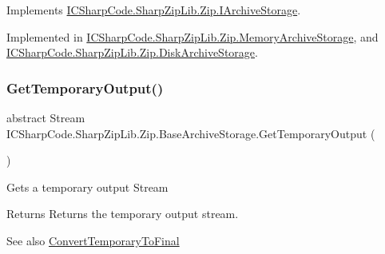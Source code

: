 Implements \hyperlink{interface_i_c_sharp_code_1_1_sharp_zip_lib_1_1_zip_1_1_i_archive_storage_ab0d4fb8b0557395851488846515ae64d}{I\+C\+Sharp\+Code.\+Sharp\+Zip\+Lib.\+Zip.\+I\+Archive\+Storage}.



Implemented in \hyperlink{class_i_c_sharp_code_1_1_sharp_zip_lib_1_1_zip_1_1_memory_archive_storage_acb1d6118fd6a693de793dd704b641ecc}{I\+C\+Sharp\+Code.\+Sharp\+Zip\+Lib.\+Zip.\+Memory\+Archive\+Storage}, and \hyperlink{class_i_c_sharp_code_1_1_sharp_zip_lib_1_1_zip_1_1_disk_archive_storage_a55cb8ad8e73dcd8196fce9c0b41336d9}{I\+C\+Sharp\+Code.\+Sharp\+Zip\+Lib.\+Zip.\+Disk\+Archive\+Storage}.

\mbox{\label{class_i_c_sharp_code_1_1_sharp_zip_lib_1_1_zip_1_1_base_archive_storage_a1327afcc22749a88959c9d8614cf4c75}} 
\subsubsection{\texorpdfstring{Get\+Temporary\+Output()}{GetTemporaryOutput()}}
{\footnotesize\ttfamily abstract Stream I\+C\+Sharp\+Code.\+Sharp\+Zip\+Lib.\+Zip.\+Base\+Archive\+Storage.\+Get\+Temporary\+Output (\begin{DoxyParamCaption}{ }\end{DoxyParamCaption})\hspace{0.3cm}{\ttfamily [pure virtual]}}



Gets a temporary output Stream 

\begin{DoxyReturn}{Returns}
Returns the temporary output stream.
\end{DoxyReturn}
\begin{DoxySeeAlso}{See also}
\hyperlink{class_i_c_sharp_code_1_1_sharp_zip_lib_1_1_zip_1_1_base_archive_storage_ab20872fd7a5c31f1765bc36f3a37040f}{Convert\+Temporary\+To\+Final}


\end{DoxySeeAlso}


